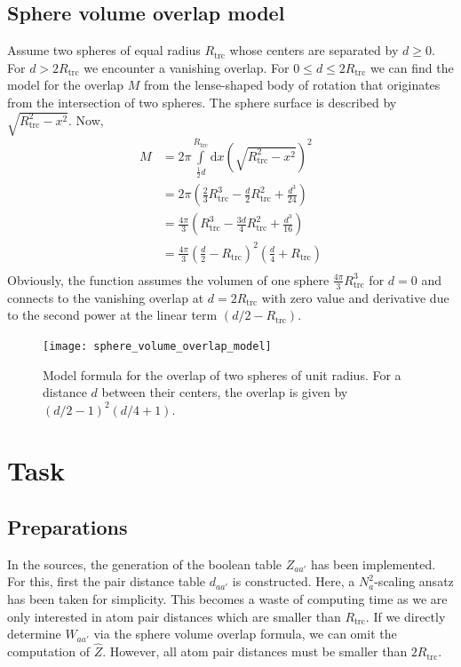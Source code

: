 \documentclass[a4paper]{article}
\newcommand{\um}[1]{_{\mathrm{#1}}}
\begin{document}
\subsection{Sphere volume overlap model}

Assume two spheres of equal radius $R\um{trc}$ whose centers are separated by $d \geq 0$.
For $d > 2 R\um{trc}$ we encounter a vanishing overlap.
For $0 \leq d \leq 2 R\um{trc}$ we can find the model for the overlap $M$ from the lense-shaped body of rotation that
originates from the intersection of two spheres.
The sphere surface is described by $\sqrt{R\um{trc}^2 - x^2}$.
Now,
\begin{align*}
  M &= 2 \pi \int\limits_{\frac 12 d}^{R\um{trc}} \mathrm d x \left( \sqrt{ R\um{trc}^2 - x^2 } \right)^2 \\
    &= 2 \pi \left( \frac 23 R\um{trc}^3 - \frac d2 R\um{trc}^2 + \frac{d^3}{24} \right) \\
    &= \frac{4\pi}{3} \left( R\um{trc}^3 - \frac{3d}{4} R\um{trc}^2 + \frac{d^3}{16} \right) \\
    &= \frac{4\pi}{3} \left( \frac d2 - R\um{trc} \right)^2 \left(\frac d4 + R\um{trc} \right) \\
\end{align*}
Obviously, the function assumes the volumen of one sphere $\frac{4\pi}{3} R\um{trc}^3$ for $d=0$
and connects to the vanishing overlap at $d=2R\um{trc}$ with zero value and derivative 
due to the second power at the linear term $(d/2 - R\um{trc})$.

\begin{figure}[h!]
\begin{center}
  \texttt{[image: sphere\_volume\_overlap\_model]}
  \caption{Model formula for the overlap of two spheres of unit radius. 
  For a distance $d$ between their centers, the overlap is given by $(d/2 - 1)^2 (d/4 + 1)$.}
\end{center}
\label{fig:sphere_volume_overlap_model}
\end{figure}

\section{Task}

\subsection{Preparations}

In the sources, the generation of the boolean table $Z_{aa'}$
has been implemented. For this, first the pair distance table $d_{aa'}$ is constructed.
Here, a $N_a^2$-scaling ansatz has been taken for simplicity.
This becomes a waste of computing time as we are only interested in atom pair distances
which are smaller than $R\um{trc}$.
If we directly determine $W_{aa'}$ via the sphere volume overlap formula, 
we can omit the computation of $\hat Z$.
However, all atom pair distances must be smaller than $2R\um{trc}$.
\end{document}
